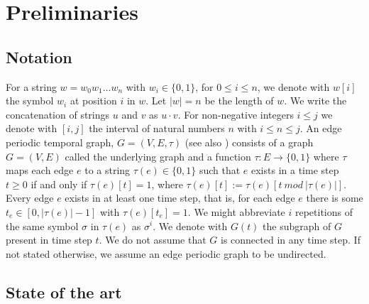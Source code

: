\chapter{Preliminaries}
\label{ch:Preliminaries}

\section{Notation}
For a string $w = w_0w_1 \dots w_n$ with $w_i \in \{0, 1\}$, for $0 \leq i \leq n$, we denote with $w[i]$ the symbol $w_i$ at position $i$ in $w$. Let $|w| = n$ be the length of $w$. We write the concatenation of strings $u$ and $v$ as $u \cdot v$. For non-negative integers $i \leq j$ we denote with $[i, j]$ the interval of natural numbers $n$ with $i \leq n \leq j$. 
An edge periodic temporal graph, $G = (V, E, \tau)$ (see also \cite{erlebach2020game}) consists of a graph $G = (V, E)$ called the underlying graph and a function $\tau : E \rightarrow \{0, 1\}$ where $\tau$ maps each edge $e$ to a string $\tau(e) \in \{0, 1\}$
such that $e$ exists in a time step $t \geq 0$ if and only if $\tau(e)[t] = 1$, where $\tau(e)[t] := \tau(e)[t~ mod~ |\tau(e)|]$.
Every edge $e$ exists in at least one time step, that is, for each edge $e$ there is some $t_e \in [0, |\tau(e)| - 1]$ with $\tau(e)[t_e] = 1$. We might abbreviate $i$ repetitions of the same symbol $\sigma$ in $\tau(e)$ as $\sigma^i$.
We denote with $G(t)$ the subgraph of $G$ present in time step $t$. We do not assume that $G$ is connected in any time step. If not stated otherwise, we assume an edge periodic graph to be undirected.


\section{State of the art}